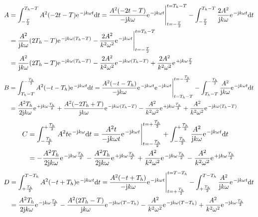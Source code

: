 \documentclass[11pt,a4paper,DIV=12]{scrartcl}
\begin{document}
%
%
%
\begin{align}
	A&=\int_{-\frac{T}{2}}^{T_h-T}A^2(-2t-T)\e^{-\im k \omega t}\diff t=\frac{A^2(-2t-T)}{-\im k \omega }\e^{-\im k \omega t}\Bigg |_{t=-\frac{T}{2}}^{t=T_h-T}-\int_{-\frac{T}{2}}^{T_h-T}\frac{2A^2}{\im k \omega}\e^{-\im k \omega t}\diff t\nonumber \\
	&=\frac{A^2}{\im k \omega}(2T_h-T)\e^{-\im k \omega (T_h-T)}-\frac{2A^2}{k^2\omega^2}\e^{-\im k \omega t}\Bigg |_{t=-\frac{T
		}{2}}^{t=T_h-T}\nonumber \\
	&=\frac{A^2}{\im k \omega}(2T_h-T)\e^{-\im k \omega (T_h-T)}-\frac{2A^2}{k^2\omega^2}\e^{-\im k \omega (T_h-T)}+\frac{2A^2}{k^2\omega^2}\e^{+\im k \omega \frac{T}{2}}
\end{align}
%
%
%
\begin{align}
	B&=\int_{T_h-T}^{-\frac{T_h}{2}}A^2(-t-T_h)\e^{-\im k \omega t}\diff t=\frac{A^2(-t-T_h)}{-\im k \omega}\e^{-\im k \omega t}\e^{-\im k \omega t}\Bigg |_{t=T_h-T}^{t=-\frac{T_h}{2}}-\int_{T_h-T}^{-\frac{T_h}{2}}\frac{A^2}{\im k \omega}\e^{-\im k \omega t}\diff t\nonumber \\
	&=\frac{A^2T_h}{2\im k \omega}\e^{+\im k \omega \frac{T_h}{2}}+\frac{A^2(-2T_h+T)}{\im k \omega}\e^{-\im k \omega (T_h-T)}-\frac{A^2}{k^2\omega^2}\e^{+\im k \omega \frac{T_h}{2}}+\frac{A^2}{k^2\omega^2}\e^{-\im k \omega (T_h-T)}
\end{align}
%
%
%
\begin{align}
	C&=\int_{-\frac{T_h}{2}}^{+\frac{T_h}{2}}A^2t\e^{-\im k \omega }\diff t=\frac{A^2t}{-\im k \omega t}\e^{-\im k \omega t}\Bigg |_{t=-\frac{T_h}{2}}^{t=+\frac{T_h}{2}}+\int_{-\frac{T_h}{2}}^{+\frac{T_h}{2}}\frac{A^2}{\im k \omega}\e^{-\im k \omega t}\diff t\nonumber \\
	&=-\frac{A^2T_h}{2\im k \omega}\e^{-\im k \omega \frac{T_h}{2}}-\frac{A^2T_h}{2\im k \omega}\e^{+\im k \omega \frac{T_h}{2}}+\frac{A^2}{k^2\omega^2}\e^{-\im k \omega \frac{T_h}{2}}-\frac{A^2}{k^2\omega^2}\e^{+\im k \omega \frac{T_h}{2}}
\end{align}
%
%
%
\begin{align}
	D&=\int_{+\frac{T_h}{2}}^{T-T_h}A^2(-t+T_h)\e^{-\im k \omega t}\diff t=\frac{A^2(-t+T_h)}{-\im k \omega}\e^{-\im k \omega t}\Bigg |_{t=+\frac{T_h}{2}}^{t=T-T_h}-\int_{+\frac{T_h}{2}}^{T-T_h}\frac{A^2}{\im k \omega}\e^{-\im k \omega t}\diff t\nonumber \\
	&=\frac{A^2T_h}{2\im k \omega}\e^{-\im k \omega \frac{T_h}{2}}-\frac{A^2(2T_h-T)}{\im k \omega}\e^{-\im k \omega (T-T_h)}-\frac{A^2}{k^2\omega^2}\e^{-\im k \omega (T-T_h)}+\frac{A^2}{ k^2 \omega^2}\e^{-\im k \omega \frac{T_h}{2}}
\end{align}
\end{document}
